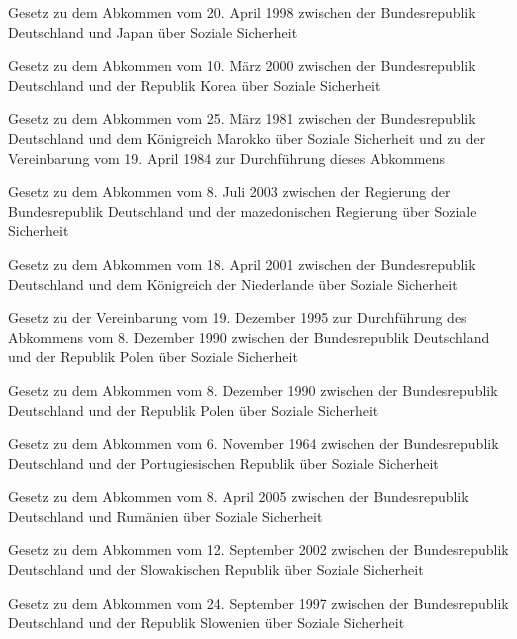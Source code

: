 \item[{SozSichAbkJPNG}] Gesetz zu dem Abkommen vom 20. April 1998 zwischen der Bundesrepublik Deutschland und Japan über Soziale Sicherheit

\item[{SozSichAbkKORG}] Gesetz zu dem Abkommen vom 10. März 2000 zwischen der Bundesrepublik Deutschland und der Republik Korea über Soziale Sicherheit

\item[{SozSichAbkMARG}] Gesetz zu dem Abkommen vom 25. März 1981 zwischen der Bundesrepublik Deutschland und dem Königreich Marokko über Soziale Sicherheit und zu der Vereinbarung vom 19. April 1984 zur Durchführung dieses Abkommens

\item[{SozSichAbkMKDG}] Gesetz zu dem Abkommen vom 8. Juli 2003 zwischen der Regierung der Bundesrepublik Deutschland und der mazedonischen Regierung über Soziale Sicherheit

\item[{SozSichAbkNLDG}] Gesetz zu dem Abkommen vom 18. April 2001 zwischen der Bundesrepublik Deutschland und dem Königreich der Niederlande über Soziale Sicherheit

\item[{SozSichAbkPOLDVVbgG}] Gesetz zu der Vereinbarung vom 19. Dezember 1995 zur Durchführung des Abkommens vom 8. Dezember 1990 zwischen der Bundesrepublik Deutschland und der Republik Polen über Soziale Sicherheit

\item[{SozSichAbkPOLG}] Gesetz zu dem Abkommen vom 8. Dezember 1990 zwischen der Bundesrepublik Deutschland und der Republik Polen über Soziale Sicherheit

\item[{SozSichAbkPRTG}] Gesetz zu dem Abkommen vom 6. November 1964 zwischen der Bundesrepublik Deutschland und der Portugiesischen Republik über Soziale Sicherheit

\item[{SozSichAbkROMG}] Gesetz zu dem Abkommen vom 8. April 2005 zwischen der Bundesrepublik Deutschland und Rumänien über Soziale Sicherheit

\item[{SozSichAbkSVKG}] Gesetz zu dem Abkommen vom 12. September 2002 zwischen der Bundesrepublik Deutschland und der Slowakischen Republik über Soziale Sicherheit

\item[{SozSichAbkSVNG}] Gesetz zu dem Abkommen vom 24. September 1997 zwischen der Bundesrepublik Deutschland und der Republik Slowenien über Soziale Sicherheit

